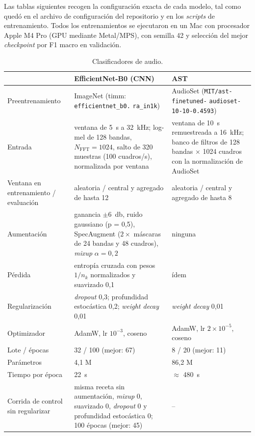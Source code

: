 Las tablas siguientes recogen la configuración exacta de cada modelo, tal
como quedó en el archivo de configuración del repositorio y en los
\textit{scripts} de entrenamiento. Todos los entrenamientos se ejecutaron en
un Mac con procesador Apple M4 Pro (GPU mediante Metal/MPS), con semilla 42
y selección del mejor \textit{checkpoint} por F1 macro en validación.

\begin{table}[H]
  \centering\small
  \caption{Clasificadores de audio.}
  \label{tab:hp-audio}
  \begin{tabularx}{\textwidth}{@{}>{\raggedright\arraybackslash}p{3.1cm} X X@{}}
    \toprule
    & EfficientNet-B0 (CNN) & AST \\
    \midrule
    Preentrenamiento & ImageNet (timm: \texttt{efficientnet\_b0.} \texttt{ra\_in1k}) & AudioSet (\texttt{MIT/ast-finetuned-} \texttt{audioset-10-10-0.4593}) \\
    Entrada & ventana de \SI{5}{\second} a \SI{32}{\kilo\hertz}; log-mel de 128 bandas, $N_\mathrm{FFT} = 1024$, salto de 320 muestras (100 cuadros/s), normalizada por ventana & ventana de \SI{10}{\second} remuestreada a \SI{16}{\kilo\hertz}; banco de filtros de 128 bandas $\times$ 1024 cuadros con la normalización de AudioSet \\
    Ventana en entrenamiento / evaluación & aleatoria / central y agregado de hasta 12 & aleatoria / central y agregado de hasta 8 \\
    Aumentación & ganancia $\pm$\SI{6}{\decibel}, ruido gaussiano (p = 0,5), SpecAugment ($2\times$ máscaras de 24 bandas y 48 cuadros), \textit{mixup} $\alpha = 0{,}2$ & ninguna \\
    Pérdida & entropía cruzada con pesos $1/n_k$ normalizados y suavizado 0,1 & ídem \\
    Regularización & \textit{dropout} 0,3; profundidad estocástica 0,2; \textit{weight decay} 0,01 & \textit{weight decay} 0,01 \\
    Optimizador & AdamW, lr $10^{-3}$, coseno & AdamW, lr $2 \times 10^{-5}$, coseno \\
    Lote / épocas & 32 / 100 (mejor: 67) & 8 / 20 (mejor: 11) \\
    Parámetros & 4,1 M & 86,2 M \\
    Tiempo por época & \SI{22}{\second} & $\approx$ \SI{480}{\second} \\
    Corrida de control sin regularizar & misma receta sin aumentación, \textit{mixup} 0, suavizado 0, \textit{dropout} 0 y profundidad estocástica 0; 100 épocas (mejor: 45) & -- \\
    \bottomrule
  \end{tabularx}
\end{table}


